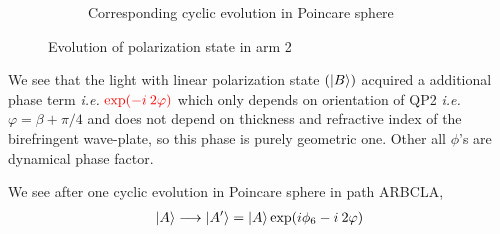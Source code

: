 \documentclass[11pt,a4paper]{article}
\numberwithin{equation}{section}
\begin{document}
\begin{figure}[t]
\begin{subfigure}[H]{0.4\textwidth}
		\caption{Corresponding cyclic evolution in Poincare sphere}
		\label{fig:pancha b}
	\end{subfigure}
	\caption{Evolution of polarization state in arm 2}
	\label{fig:pancha}
\end{figure}


We see that the light with linear polarization state $(\ket{B})$ acquired a additional phase term \textit{i.e.} ${\color{red}\exp(-i\:2\varphi)}$ which only depends on orientation of QP2 \textit{i.e.} $\varphi= \beta+\pi/4$ and does not depend on thickness and refractive index of the birefringent wave-plate, so this phase is purely geometric one. Other all $\phi$'s are dynamical phase factor.\cite{WO}

We see after one cyclic evolution in Poincare sphere in path ARBCLA,
\begin{align}
	\ket{A}\longrightarrow\ket{A'}=\ket{A}\exp(i\phi_6-i\:2\varphi)
\end{align}
\end{document}
